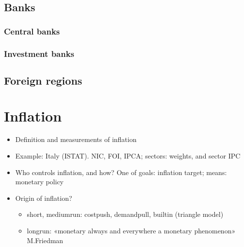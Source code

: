 \documentclass[letterpaper,10pt,italian]{jupyterBook}
\begin{document}
\section{Banks}
\label{\detokenize{ch/actors:banks}}\label{\detokenize{ch/actors:fin-edu-actors-banks}}

\subsection{Central banks}
\label{\detokenize{ch/actors:central-banks}}\label{\detokenize{ch/actors:fin-edu-actors-banks-cb}}

\subsection{Investment banks}
\label{\detokenize{ch/actors:investment-banks}}\label{\detokenize{ch/actors:fin-edu-actors-banks-inv}}

\section{Foreign regions}
\label{\detokenize{ch/actors:foreign-regions}}\label{\detokenize{ch/actors:fin-edu-actors-banks-foreign}}
\sphinxstepscope


\chapter{Inflation}
\label{\detokenize{ch/inflation:inflation}}\label{\detokenize{ch/inflation:fin-edu-inflation}}\label{\detokenize{ch/inflation::doc}}\begin{itemize}
\item {} 
\sphinxAtStartPar
Definition and measurements of inflation

\item {} 
\sphinxAtStartPar
Example: Italy (ISTAT). NIC, FOI, IPCA; sectors: weights, and sector IPC

\item {} 
\sphinxAtStartPar
Who controls inflation, and how? One of {\hyperref[\detokenize{ch/actors:fin-edu-actors-banks-cb}]{}} goals: inflation target; means: monetary policy

\item {} 
\sphinxAtStartPar
Origin of inflation?
\begin{itemize}
\item {} 
\sphinxAtStartPar
short\sphinxhyphen{}, medium\sphinxhyphen{}run: cost\sphinxhyphen{}push, demand\sphinxhyphen{}pull, built\sphinxhyphen{}in (triangle model)

\item {} 
\sphinxAtStartPar
long\sphinxhyphen{}run: «monetary always and everywhere a monetary phenomenon» M.Friedman

\end{itemize}

\end{itemize}
\end{document}
